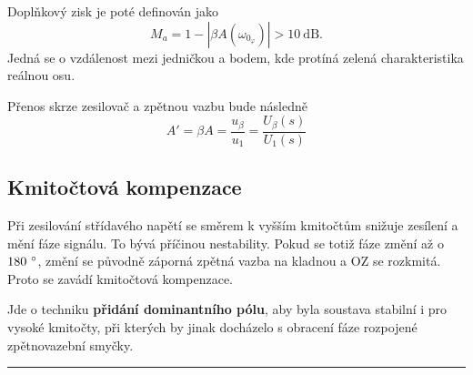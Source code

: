 \documentclass[a4paper,12pt]{article}   %
\begin{document}
Doplňkový zisk je poté definován jako
\begin{equation*}
    M_a = 1-|\beta A(\omega_{0_\varphi})| > 10~\text{dB}.
\end{equation*}
Jedná se o vzdálenost mezi jedničkou a bodem, kde protíná zelená charakteristika reálnou osu.

Přenos skrze zesilovač a zpětnou vazbu bude následně
\begin{equation*}
    A' = \beta A = \frac{u_\beta}{u_\text{1}} = \frac{U_\beta (s)}{U_\text{1}(s)}
\end{equation*}

\subsection*{Kmitočtová kompenzace}
Při zesilování střídavého napětí se směrem k vyšším kmitočtům snižuje zesílení a mění fáze signálu. To bývá příčinou nestability. Pokud se totiž fáze změní až o $180~\degree$, změní se původně záporná zpětná vazba na kladnou a OZ se rozkmitá. Proto se zavádí kmitočtová kompenzace.

Jde o techniku \textbf{přidání dominantního pólu}, aby byla soustava stabilní i pro vysoké kmitočty, při kterých by jinak docházelo s obracení fáze rozpojené zpětnovazební smyčky.
\\
\hrule%









\end{document}
